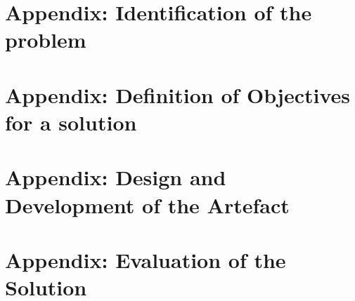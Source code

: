 \begin{appendices}



\section{Appendix: Identification of the problem}\label{appendix:A}

\newpage

\section{Appendix: Definition of Objectives for a solution}\label{appendix:B}

\newpage

\section{Appendix: Design and Development of the Artefact}\label{appendix:C}

\newpage

\section{Appendix: Evaluation of the Solution}\label{appendix:D}





\end{appendices}

